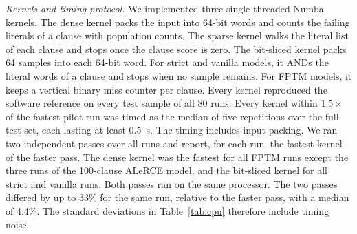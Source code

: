 \documentclass[preprint,12pt]{elsarticle}
\begin{document}
\textit{Kernels and timing protocol.} We implemented three single-threaded Numba kernels.
The dense kernel packs the input into 64-bit words and counts the failing literals of a clause with population counts.
The sparse kernel walks the literal list of each clause and stops once the clause score is zero.
The bit-sliced kernel packs 64 samples into each 64-bit word. For strict and vanilla models, it ANDs the literal words of a clause and stops when no sample remains. For FPTM models, it keeps a vertical binary miss counter per clause.
Every kernel reproduced the software reference on every test sample of all 80 runs.
Every kernel within $1.5\times$ of the fastest pilot run was timed as the median of five repetitions over the full test set, each lasting at least 0.5~s. The timing includes input packing. We ran two independent passes over all runs and report, for each run, the fastest kernel of the faster pass.
The dense kernel was the fastest for all FPTM runs except the three runs of the 100-clause ALeRCE model, and the bit-sliced kernel for all strict and vanilla runs.
Both passes ran on the same processor. The two passes differed by up to 33\% for the same run, relative to the faster pass, with a median of 4.4\%. The standard deviations in Table~\ref{tab:cpu} therefore include timing noise.
\end{document}
